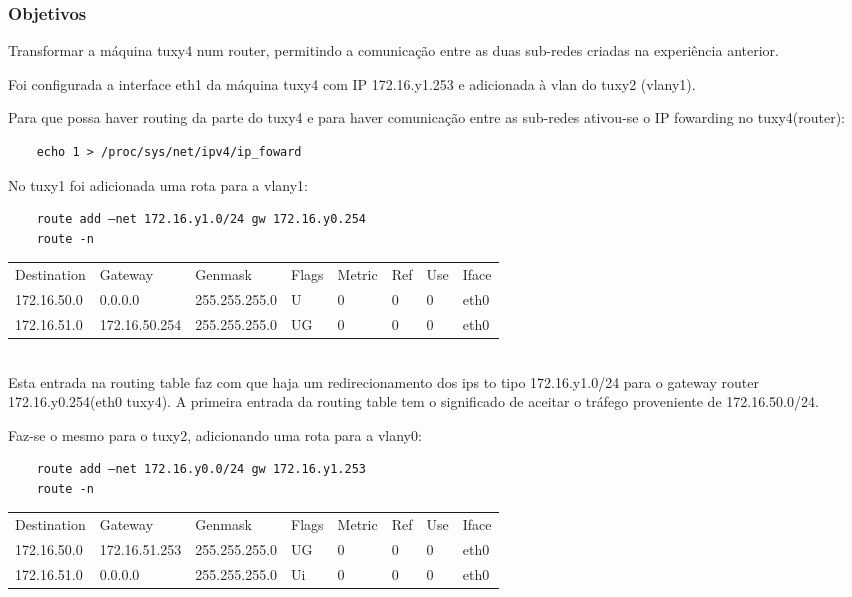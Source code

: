 \documentclass[a4paper]{article}
\begin{document}
\subsubsection{Objetivos}
Transformar a máquina tuxy4 num router, permitindo a comunicação entre as duas sub-redes criadas na experiência anterior.

Foi configurada a interface eth1 da máquina tuxy4 com IP 172.16.y1.253 e adicionada à vlan do tuxy2 (vlany1).

Para que possa haver routing da parte do tuxy4 e para haver comunicação entre as sub-redes ativou-se o IP fowarding no tuxy4(router): 
\begin{verbatim}
	echo 1 > /proc/sys/net/ipv4/ip_foward
\end{verbatim}

No tuxy1 foi adicionada uma rota para a vlany1:
\begin{verbatim}
	route add –net 172.16.y1.0/24 gw 172.16.y0.254
	route -n
\end{verbatim}

\begin{tabular}{l l l l l l l l}
Destination & Gateway & Genmask & Flags & Metric & Ref & Use & Iface \\
172.16.50.0 & 0.0.0.0 & 255.255.255.0 & U & 0 & 0 & 0 & eth0 \\
172.16.51.0 & 172.16.50.254 & 255.255.255.0 & UG & 0 & 0 & 0 & eth0
\end{tabular} \\

Esta entrada na routing table faz com que haja um redirecionamento dos ips to tipo 172.16.y1.0/24 para o gateway router
172.16.y0.254(eth0 tuxy4). A primeira entrada da routing table tem o significado de aceitar o tráfego proveniente de 172.16.50.0/24. 

Faz-se o mesmo para o tuxy2, adicionando uma rota para a vlany0:
\begin{verbatim}
	route add –net 172.16.y0.0/24 gw 172.16.y1.253
	route -n
\end{verbatim}

\begin{tabular}{l l l l l l l l}
Destination & Gateway & Genmask & Flags & Metric & Ref & Use & Iface \\
172.16.50.0 & 172.16.51.253 & 255.255.255.0 & UG & 0 & 0 & 0 & eth0 \\
172.16.51.0 & 0.0.0.0 & 255.255.255.0 & Ui & 0 & 0 & 0 & eth0
\end{tabular} \\
\end{document}
